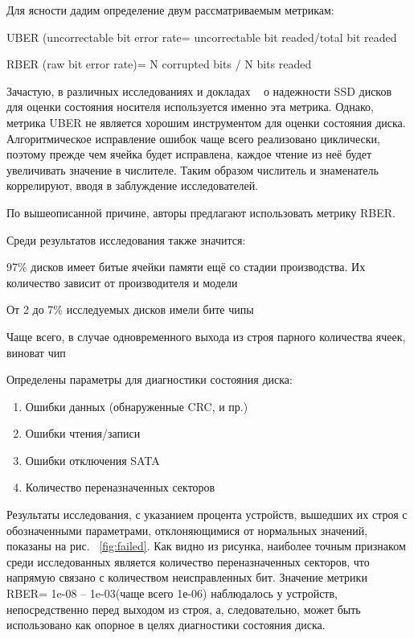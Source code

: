 Для ясности дадим определение двум рассматриваемым метрикам:
\begin{itemize*}
	\item{UBER (uncorrectable bit error rate= uncorrectable bit readed/total bit readed}
	\item{RBER (raw bit error rate)= N corrupted bits / N bits readed}
\end{itemize*}
Зачастую, в различных исследованиях и докладах ~\cite{art} о надежности SSD дисков для оценки состояния носителя используется именно эта метрика. 
Однако, метрика UBER не является хорошим инструментом для оценки состояния диска. Алгоритмическое исправление ошибок чаще всего реализовано циклически, поэтому прежде чем ячейка будет исправлена, каждое чтение из неё будет увеличивать значение в числителе. Таким образом числитель и знаменатель коррелируют, вводя в заблуждение исследователей. 

По вышеописанной причине, авторы предлагают использовать метрику RBER. 


Среди результатов исследования также значится:
\begin{itemize*}
	\item{97\% дисков имеет битые ячейки памяти ещё со стадии производства. Их количество зависит от производителя и модели} 
    \item{От 2 до 7\% исследуемых дисков имели бите чипы}
    \item{Чаще всего, в случае одновременного выхода из строя парного количества ячеек, виноват чип} 
    \item{Определены параметры для диагностики состояния диска:}
	\begin{enumerate}
		\item{Ошибки данных (обнаруженные CRC, и пр.)}
		\item{Ошибки чтения/записи}
		\item{Ошибки отключения SATA}
		\item{Количество переназначенных секторов}
	\end{enumerate}
\end{itemize*}

Результаты исследования, с указанием процента устройств, вышедших их строя с обозначенными параметрами, отклоняющимися от нормальных значений, показаны на рис. ~\ref{fig:failed}. Как видно из рисунка, наиболее точным признаком среди исследованных является количество переназначенных секторов, что напрямую связано с количеством неисправленных бит.
Значение метрики RBER= 1e-08 – 1e-03(чаще всего 1е-06) наблюдалось у устройств, непосредственно перед выходом из строя, а, следовательно, может быть использовано как опорное в целях диагностики состояния диска.

